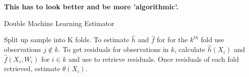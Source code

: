 \textbf{This has to look better and be more 'algorithmic'.}
\begin{algorithm}
    \caption{Double Machine Learning Estimator}
    \begin{algorithmic}[1]
        \State Split up sample into K folds. 
        \State To estimate $\widehat{h}$ and $\widehat{f}$ for for the $k^{th}$ fold use observations $j \notin k$. 
        \State To get residuals for observations in $k$, calculate $\widehat{h}(X_i)$ and $\widehat{f}(X_i, W_i)$ for $i \in k$ and use to retrieve residuals.
        \State Once residuals of each fold retrieved, estimate $\theta(X_i)$.
    \end{algorithmic}
\end{algorithm}